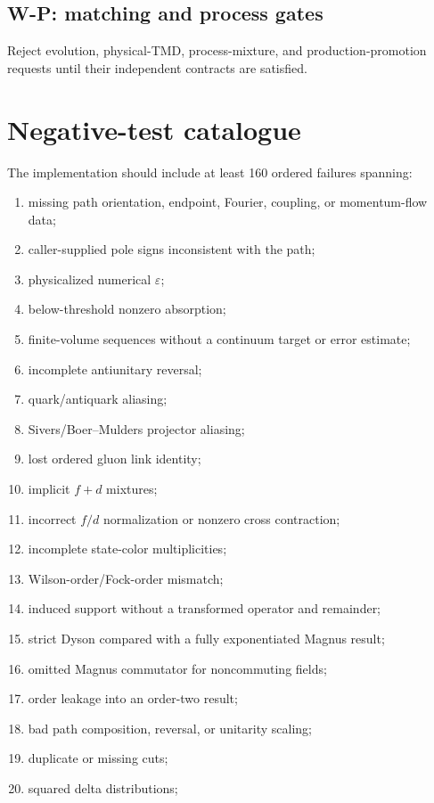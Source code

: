 \documentclass[11pt]{article}
\newcommand{\eps}{\varepsilon}
\begin{document}
\subsection{W-P: matching and process gates}
Reject evolution, physical-TMD, process-mixture, and production-promotion
requests until their independent contracts are satisfied.

\section{Negative-test catalogue}
\label{sec:negative}

The implementation should include at least 160 ordered failures spanning:
\begin{enumerate}
 \item missing path orientation, endpoint, Fourier, coupling, or momentum-flow data;
 \item caller-supplied pole signs inconsistent with the path;
 \item physicalized numerical \(\eps\);
 \item below-threshold nonzero absorption;
 \item finite-volume sequences without a continuum target or error estimate;
 \item incomplete antiunitary reversal;
 \item quark/antiquark aliasing;
 \item Sivers/Boer--Mulders projector aliasing;
 \item lost ordered gluon link identity;
 \item implicit \(f+d\) mixtures;
 \item incorrect \(f/d\) normalization or nonzero cross contraction;
 \item incomplete state-color multiplicities;
 \item Wilson-order/Fock-order mismatch;
 \item induced support without a transformed operator and remainder;
 \item strict Dyson compared with a fully exponentiated Magnus result;
 \item omitted Magnus commutator for noncommuting fields;
 \item order leakage into an order-two result;
 \item bad path composition, reversal, or unitarity scaling;
 \item duplicate or missing cuts;
 \item squared delta distributions;

\end{enumerate}
\end{document}
